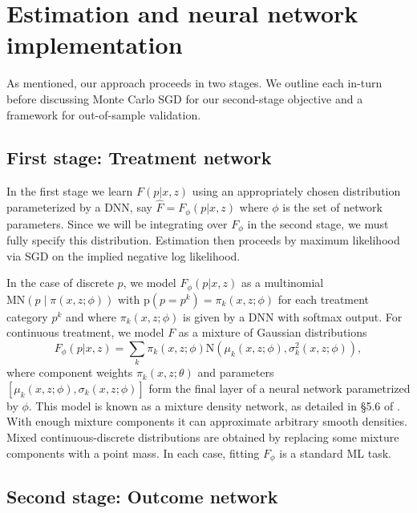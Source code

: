 \documentclass[12pt]{article}
\newcommand{\mr}[1]{\mathrm{#1}}
\newcommand{\price}{\ensuremath{p}}
\begin{document}
\section{Estimation and neural network implementation}
\label{sec:estim}

As mentioned, our approach proceeds in two stages.  We outline each in-turn  before discussing Monte Carlo SGD for our second-stage objective and a framework for out-of-sample validation.

\subsection{First stage: Treatment network}

In the first stage we learn $F(\price|x, z)$ using an appropriately chosen distribution parameterized by a DNN, say $\hat F = F_\phi(\price|x, z)$ where $\phi$ is the set of network parameters. Since we will be integrating over  $F_\phi$ in the second stage, we must fully specify this distribution. Estimation then proceeds by maximum likelihood via SGD on the implied negative log likelihood.

In the case of discrete $\price$, we model $F_\phi(\price|x,z)$ as a
multinomial  $\mathrm{MN}\left(\price\mid \pi(x,z; \phi)\right)$
with $\mr{p}(\price=\price^k) = \pi_k(x,z;\phi)$ for each treatment category $\price^k$ and where
$\pi_k(x,z;\phi)$ is given by a DNN with softmax output. For continuous
treatment, we model $F$ as a mixture of Gaussian distributions  $$ F_\phi
(\price|x,z) = \sum_k \pi_k(x,z;\phi) \mathrm{N}\left(\mu_k(x,z;\phi),
\sigma^2_k(x,z;\phi)\right),$$  where component weights $\pi_k(x,z;\theta)$ and
parameters $\left[\mu_k(x,z;\phi), \sigma_k(x,z;\phi)\right]$ form the final
layer of a neural network parametrized by $\phi$.  This model is known as a
mixture density network, as detailed in \S 5.6 of  \cite{bishop_pattern_2006}.
With enough mixture components it can approximate arbitrary smooth
densities.  Mixed continuous-discrete distributions are obtained by
replacing some mixture components with a point mass.  In each case, fitting
$F_\phi$ is a standard ML task.



\subsection{Second stage: Outcome network} 
\end{document}
